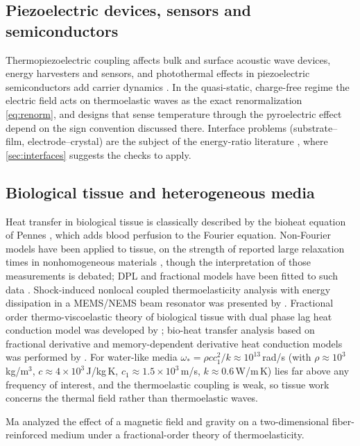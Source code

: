 \subsection{Piezoelectric devices, sensors and semiconductors}
Thermopiezoelectric coupling affects bulk and surface acoustic wave devices, energy harvesters and sensors, and photothermal effects in piezoelectric semiconductors add carrier dynamics \citep{Gupta2023,Gupta2024a,Gupta2026HeatMap}. In the quasi-static, charge-free regime the electric field acts on thermoelastic waves as the exact renormalization \eqref{eq:renorm}, and designs that sense temperature through the pyroelectric effect depend on the sign convention discussed there. Interface problems (substrate--film, electrode--crystal) are the subject of the energy-ratio literature \citep{Barak2023IJP,Barak2023JTS,Gupta2023Energy,Kumar2024,Kumar2024a}, where \cref{sec:interfaces} suggests the checks to apply.

\subsection{Biological tissue and heterogeneous media}
Heat transfer in biological tissue is classically described by the bioheat equation of Pennes \citep{Pennes1948}, which adds blood perfusion to the Fourier equation. Non-Fourier models have been applied to tissue, on the strength of reported large relaxation times in nonhomogeneous materials \citep{Kaminski1990,Mitra1995}, though the interpretation of those measurements is debated; DPL and fractional models have been fitted to such data \citep{vanDerMerwe2021,Yu2024}. Shock-induced nonlocal coupled thermoelasticity analysis with energy dissipation in a MEMS/NEMS beam resonator was presented by \citep{Hosseini2017}. Fractional order thermo-viscoelastic theory of biological tissue with dual phase lag heat conduction model was developed by \citep{Li2021}; bio-heat transfer analysis based on fractional derivative and memory-dependent derivative heat conduction models was performed by \citep{Zhang2021}. For water-like media $\omega_*=\rho cc_1^2/k\approx10^{13}$\,rad/s (with $\rho\approx10^3$\,kg/m$^3$, $c\approx4\times10^3$\,J/kg\,K, $c_1\approx1.5\times10^3$\,m/s, $k\approx0.6$\,W/m\,K) lies far above any frequency of interest, and the thermoelastic coupling is weak, so tissue work concerns the thermal field rather than thermoelastic waves.

Ma \citep{Ma2020} analyzed the effect of a magnetic field and gravity on a two-dimensional fiber-reinforced medium under a fractional-order theory of thermoelasticity.

